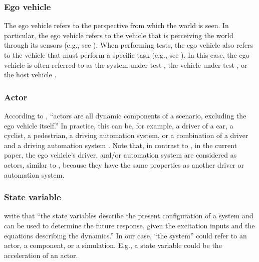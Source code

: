 \subsubsection{Ego vehicle}
\label{sec:ego vehicle}
The ego vehicle refers to the perspective from which the world is seen. In particular, the ego vehicle refers to the vehicle that is perceiving the world through its sensors (e.g., see \autocite{Bonnin2014}). When performing tests, the ego vehicle also refers to the vehicle that must perform a specific task (e.g., see \autocite{althoff2017CommonRoad}). In this case, the ego vehicle is often referred to as the system under test \autocite{stellet2015taxonomy}, the vehicle under test \autocite{gietelink2006development}, or the host vehicle \autocite{gietelink2006development}.

\subsubsection{Actor}
\label{sec:actor}

According to \textcite{catapult2018musicc}, ``actors are all dynamic components of a scenario, excluding the ego vehicle itself.'' In practice, this can be, for example, a driver of a car, a cyclist, a pedestrian, a driving automation system, or a combination of a driver and a driving automation system \autocite{geyer2014}. Note that, in contrast to \autocite{catapult2018musicc}, in the current paper, the ego vehicle's driver, and/or automation system are considered as actors, similar to \autocite{geyer2014},  because they have the same properties as another driver or automation system.


\cstart 
\subsubsection{State variable} 
\label{sec:state variable}
\textcite[p.~163]{dorf2011modern} write that ``the state variables describe the present configuration of a system and can be used to determine the future response, given the excitation inputs and the equations describing the dynamics.'' In our case, ``the system'' could refer to an actor, a component, or a simulation. E.g., a state variable could be the acceleration of an actor.

